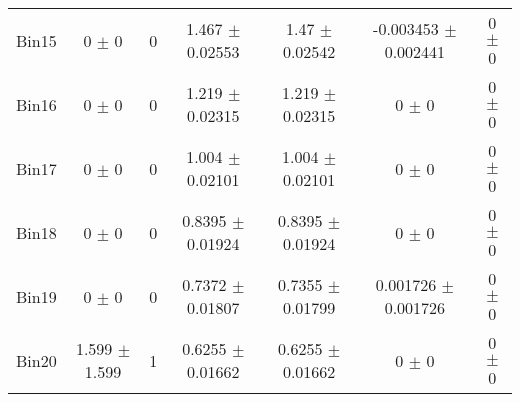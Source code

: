 \begin{tabular}{@{\extracolsep{4pt}}lcccccc@{}}
     Bin15 & 0 $\pm$ 0 & 0 & 1.467 $\pm$ 0.02553 & 1.47 $\pm$ 0.02542 & -0.003453 $\pm$ 0.002441 & 0 $\pm$ 0 \\ 
     Bin16 & 0 $\pm$ 0 & 0 & 1.219 $\pm$ 0.02315 & 1.219 $\pm$ 0.02315 & 0 $\pm$ 0 & 0 $\pm$ 0 \\ 
     Bin17 & 0 $\pm$ 0 & 0 & 1.004 $\pm$ 0.02101 & 1.004 $\pm$ 0.02101 & 0 $\pm$ 0 & 0 $\pm$ 0 \\ 
     Bin18 & 0 $\pm$ 0 & 0 & 0.8395 $\pm$ 0.01924 & 0.8395 $\pm$ 0.01924 & 0 $\pm$ 0 & 0 $\pm$ 0 \\ 
     Bin19 & 0 $\pm$ 0 & 0 & 0.7372 $\pm$ 0.01807 & 0.7355 $\pm$ 0.01799 & 0.001726 $\pm$ 0.001726 & 0 $\pm$ 0 \\ 
     Bin20 & 1.599 $\pm$ 1.599 & 1 & 0.6255 $\pm$ 0.01662 & 0.6255 $\pm$ 0.01662 & 0 $\pm$ 0 & 0 $\pm$ 0 \\ 
\hline\hline
  \end{tabular}
